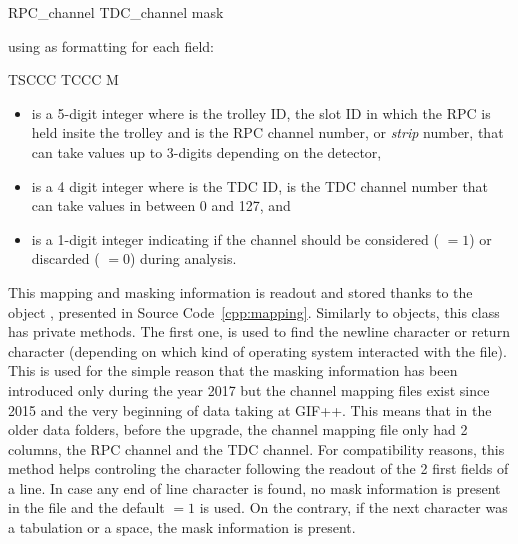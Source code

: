 	\begin{textcode}
 RPC_channel	TDC_channel	mask
	\end{textcode}
	\vspace{5mm}
	
	using as formatting for each field:\\
	
	\begin{textcode}
 TSCCC	TCCC	M
	\end{textcode}
	
	\begin{itemize}
		\item[\textinline{TSCCC}] is a 5-digit integer where  is the trolley ID,  the slot ID in which the RPC is held insite the trolley  and  is the RPC channel number, or \textit{strip} number, that can take values up to 3-digits depending on the detector,
		\item[\textinline{TCCC}] is a 4 digit integer where  is the TDC ID,  is the TDC channel number that can take values in between 0 and 127, and
		\item[\textinline{M}] is a 1-digit integer indicating if the channel should be considered ( $=1$) or discarded ( $=0$) during analysis.
	\end{itemize}
	
	This mapping and masking information is readout and stored thanks to the object , presented in Source Code~\ref{cpp:mapping}. Similarly to  objects, this class has private methods. The first one,  is used to find the newline character  or return character  (depending on which kind of operating system interacted with the file). This is used for the simple reason that the masking information has been introduced only during the year 2017 but the channel mapping files exist since 2015 and the very beginning of data taking at GIF++. This means that in the older data folders, before the upgrade, the channel mapping file only had 2 columns, the RPC channel and the TDC channel. For compatibility reasons, this method helps controling the character following the readout of the 2 first fields of a line. In case any end of line character is found, no mask information is present in the file and the default  $=1$ is used. On the contrary, if the next character was a tabulation or a space, the mask information is present.
	
